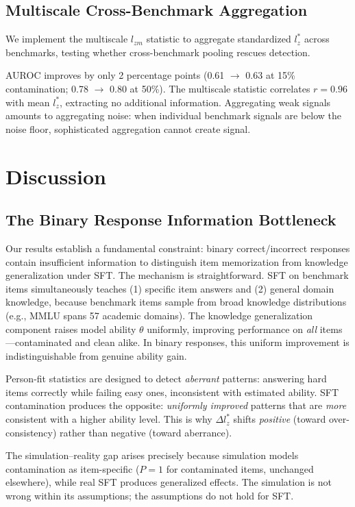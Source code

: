 \documentclass[11pt,a4paper]{article}
\begin{document}
\subsection{Multiscale Cross-Benchmark Aggregation}

We implement the multiscale $l_{zm}$ statistic \cite{hong2021multiscale} to aggregate standardized $l_{z}^{*}$ across benchmarks, testing whether cross-benchmark pooling rescues detection.

AUROC improves by only 2 percentage points (0.61 $\to$ 0.63 at 15\% contamination; 0.78 $\to$ 0.80 at 50\%).
The multiscale statistic correlates $r = 0.96$ with mean $l_{z}^{*}$, extracting no additional information.
Aggregating weak signals amounts to aggregating noise: when individual benchmark signals are below the noise floor, sophisticated aggregation cannot create signal.

\section{Discussion}

\subsection{The Binary Response Information Bottleneck}

Our results establish a fundamental constraint: binary correct/incorrect responses contain insufficient information to distinguish item memorization from knowledge generalization under SFT.
The mechanism is straightforward.
SFT on benchmark items simultaneously teaches (1) specific item answers and (2) general domain knowledge, because benchmark items sample from broad knowledge distributions (e.g., MMLU spans 57 academic domains).
The knowledge generalization component raises model ability $\theta$ uniformly, improving performance on \emph{all} items---contaminated and clean alike.
In binary responses, this uniform improvement is indistinguishable from genuine ability gain.

Person-fit statistics are designed to detect \emph{aberrant} patterns: answering hard items correctly while failing easy ones, inconsistent with estimated ability.
SFT contamination produces the opposite: \emph{uniformly improved} patterns that are \emph{more} consistent with a higher ability level.
This is why $\Delta l_{z}^{*}$ shifts \emph{positive} (toward over-consistency) rather than negative (toward aberrance).

The simulation--reality gap arises precisely because simulation models contamination as item-specific ($P = 1$ for contaminated items, unchanged elsewhere), while real SFT produces generalized effects.
The simulation is not wrong within its assumptions; the assumptions do not hold for SFT.
\end{document}
